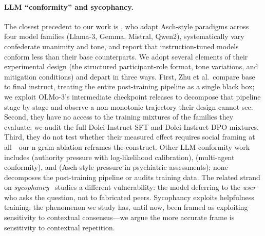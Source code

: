 \documentclass{article}
\begin{document}
\paragraph{LLM ``conformity'' and sycophancy.}
The closest precedent to our work is \citet{zhu2025conformity}, who adapt Asch-style paradigms across four model families (Llama-3, Gemma, Mistral, Qwen2), systematically vary confederate unanimity and tone, and report that instruction-tuned models conform less than their base counterparts. We adopt several elements of their experimental design (the structured participant-role format, tone variations, and mitigation conditions) and depart in three ways. First, Zhu et al.\ compare base to final instruct, treating the entire post-training pipeline as a single black box; we exploit OLMo-3's intermediate checkpoint releases to decompose that pipeline stage by stage and observe a non-monotonic trajectory their design cannot see. Second, they have no access to the training mixtures of the families they evaluate; we audit the full Dolci-Instruct-SFT and Dolci-Instruct-DPO mixtures. Third, they do not test whether their measured effect requires social framing at all---our n-gram ablation reframes the construct. Other LLM-conformity work includes \citet{celebi2025parrot} (authority pressure with log-likelihood calibration), \citet{weng2025benchform} (multi-agent conformity), and \citet{shoval2025psychiatric} (Asch-style pressure in psychiatric assessments); none decomposes the post-training pipeline or audits training data. The related strand on \emph{sycophancy}~\citep{sharma2024sycophancy, elephant2025, hong2025syconbench} studies a different vulnerability: the model deferring to the \emph{user} who asks the question, not to fabricated peers. Sycophancy exploits helpfulness training; the phenomenon we study has, until now, been framed as exploiting sensitivity to contextual consensus---we argue the more accurate frame is sensitivity to contextual repetition.
\end{document}
